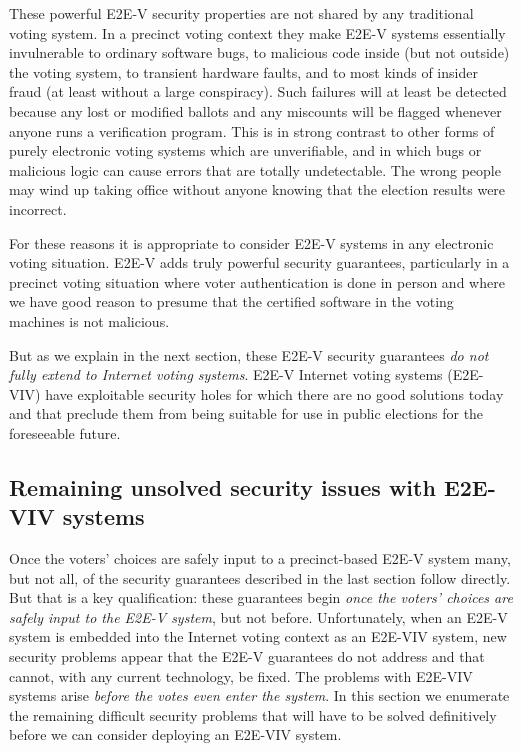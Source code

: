 These powerful E2E-V security properties are not shared by any
traditional voting system. In a precinct voting context they make
E2E-V systems essentially invulnerable to ordinary software bugs, to
malicious code inside (but not outside) the voting system, to
transient hardware faults, and to most kinds of insider fraud (at
least without a large conspiracy). Such failures will at least be
detected because any lost or modified ballots and any miscounts will
be flagged whenever anyone runs a verification program. This is in
strong contrast to other forms of purely electronic voting systems
which are unverifiable, and in which bugs or malicious logic can cause
errors that are totally undetectable.  The wrong people may wind up
taking office without anyone knowing that the election results were
incorrect.

For these reasons it is appropriate to consider E2E-V systems in any
electronic voting situation. E2E-V adds truly powerful security
guarantees, particularly in a precinct voting situation where voter
authentication is done in person and where we have good reason to
presume that the certified software in the voting machines is not
malicious.

But as we explain in the next section, these E2E-V security guarantees
\emph{do not fully extend to Internet voting systems}. E2E-V Internet
voting systems (E2E-VIV) have exploitable security holes for which
there are no good solutions today and that preclude them from being
suitable for use in public elections for the foreseeable future.
  
\subsection{Remaining unsolved security issues with E2E-VIV systems}

Once the voters' choices are safely input to a precinct-based E2E-V
system many, but not all, of the security guarantees described in the
last section follow directly. But that is a key qualification: these
guarantees begin \emph{once the voters' choices are safely input to
  the E2E-V system}, but not before. Unfortunately, when an E2E-V
system is embedded into the Internet voting context as an E2E-VIV
system, new security problems appear that the E2E-V guarantees do not
address and that cannot, with any current technology, be fixed. The
problems with E2E-VIV systems arise \emph{before the votes even enter
  the system}. In this section we enumerate the remaining difficult
security problems that will have to be solved definitively before we
can consider deploying an E2E-VIV system.


